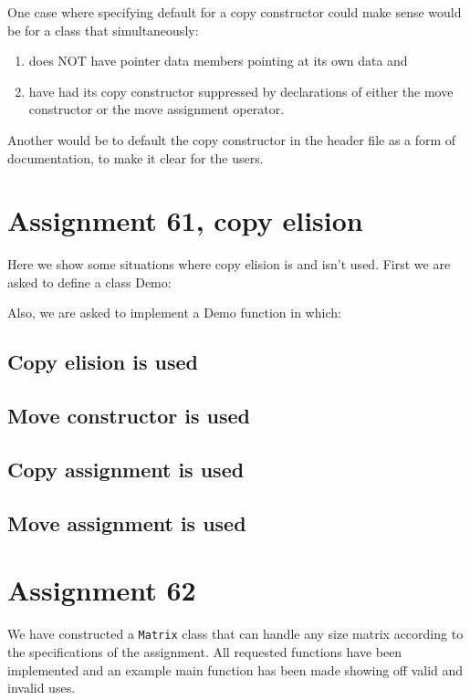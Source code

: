 \documentclass[11pt]{article}
\begin{document}
One case where specifying default for a copy constructor could make sense would be for a class that simultaneously:
\begin{enumerate}
\item does NOT have pointer data members pointing at its own data and
\item have had its copy constructor suppressed by declarations of either the move constructor or the move assignment operator.
\end{enumerate}
Another would be to default the copy constructor in the header file as a form of documentation, to make it clear for the users.

\section*{Assignment 61, copy elision}
Here we show some situations where copy elision is and isn't used. First we are asked to define a class Demo:

Also, we are asked to implement a Demo function in which:
\subsection*{Copy elision is used}

\subsection*{Move constructor is used}

\subsection*{Copy assignment is used}

\subsection*{Move assignment is used}



\section*{Assignment 62}
We have constructed a \texttt{Matrix} class that can handle any size matrix according to the specifications of the assignment.
All requested functions have been implemented and an example main function has been made showing off valid and invalid uses.
\end{document}
